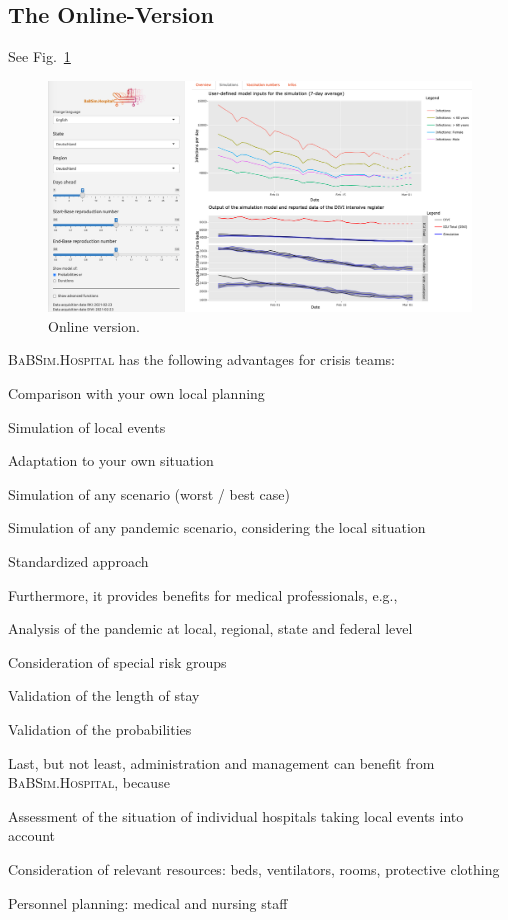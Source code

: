 \documentclass[conference]{IEEEtran}
\newcommand{\babsimhospital}{\textsc{BaBSim.Hospital}\xspace}
\begin{document}
\subsection{The Online-Version}\label{sec:online}
See Fig.~\ref{fig:demo}

\begin{figure}
    \centering
    \includegraphics[width=\linewidth]{demoFR.png}
    \caption{Online version. }
\label{fig:demo}
\end{figure}

\babsimhospital has the following advantages for crisis teams:
\begin{compactitem}
\item Comparison with your own local planning
\item Simulation of local events
\item Adaptation to your own situation
\item Simulation of any scenario (worst / best case)
\item Simulation of any pandemic scenario, considering the local situation
\item Standardized approach 
\end{compactitem}
Furthermore, it provides benefits for medical professionals, e.g.,
\begin{compactitem}
\item Analysis of the pandemic at local, regional, state and federal level
\item Consideration of special risk groups
\item Validation of the length of stay
\item Validation of the probabilities
\end{compactitem}

Last, but not least, administration and management can benefit from \babsimhospital, because
\begin{compactitem}
\item Assessment of the situation of individual hospitals taking local events into account
\item Consideration of relevant resources: beds, ventilators, rooms, protective clothing
\item Personnel planning: medical and nursing staff
\end{compactitem}
\end{document}
